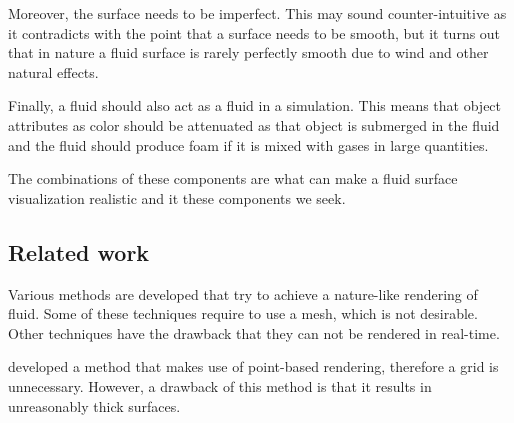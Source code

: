 Moreover, the surface needs to be imperfect. This may sound counter-intuitive as it contradicts with the point that a surface needs to be smooth, but it turns out that in nature a fluid surface is rarely perfectly smooth due to wind and other natural effects.

Finally, a fluid should also act as a fluid in a simulation. This means that object attributes as color should be attenuated as that object is submerged in the fluid and the fluid should produce foam if it is mixed with gases in large quantities. 

The combinations of these components are what can make a fluid surface visualization realistic and it these components we seek.
\subsection{Related work}
Various methods are developed that try to achieve a nature-like rendering of fluid.
Some of these techniques require to use a mesh, which is not desirable.
Other techniques have the drawback that they can not be rendered in real-time.

\cite{zhang2008adaptive} developed a method that makes use of point-based rendering, therefore a grid is unnecessary.
However, a drawback of this method is that it results in unreasonably thick surfaces.
